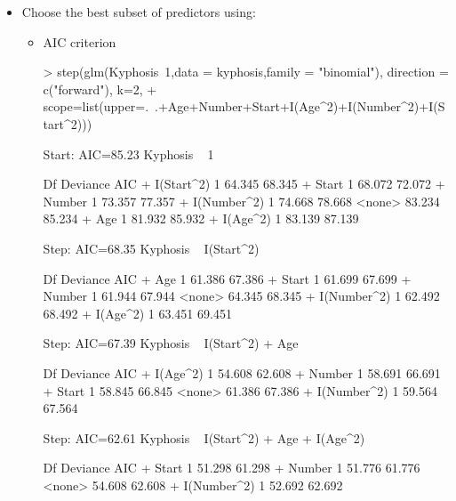 \documentclass[a4paper]{article}
\begin{document}
\begin{itemize}
Comparing AIC values:
\begin{Schunk}
\begin{Sinput}
> kyphosis.lr.model$aic
\end{Sinput}
\begin{Soutput}
[1] 69.37993
\end{Soutput}
\begin{Sinput}
> kyphosis.lr.model.squares$aic
\end{Sinput}
\begin{Soutput}
[1] 61.83235
\end{Soutput}
\end{Schunk}
Akaike Information Criterion is smaller for the bigger model.

All above tests vote in favour of the bigger model.

\item Choose the best subset of predictors using:
\begin{itemize}
\item AIC criterion
\begin{Schunk}
\begin{Sinput}
> step(glm(Kyphosis~1,data = kyphosis,family = "binomial"), direction = c("forward"), k=2, 
+ 		scope=list(upper=.~.+Age+Number+Start+I(Age^2)+I(Number^2)+I(Start^2)))	
\end{Sinput}
\begin{Soutput}
Start:  AIC=85.23
Kyphosis ~ 1

              Df Deviance    AIC
+ I(Start^2)   1   64.345 68.345
+ Start        1   68.072 72.072
+ Number       1   73.357 77.357
+ I(Number^2)  1   74.668 78.668
<none>             83.234 85.234
+ Age          1   81.932 85.932
+ I(Age^2)     1   83.139 87.139

Step:  AIC=68.35
Kyphosis ~ I(Start^2)

              Df Deviance    AIC
+ Age          1   61.386 67.386
+ Start        1   61.699 67.699
+ Number       1   61.944 67.944
<none>             64.345 68.345
+ I(Number^2)  1   62.492 68.492
+ I(Age^2)     1   63.451 69.451

Step:  AIC=67.39
Kyphosis ~ I(Start^2) + Age

              Df Deviance    AIC
+ I(Age^2)     1   54.608 62.608
+ Number       1   58.691 66.691
+ Start        1   58.845 66.845
<none>             61.386 67.386
+ I(Number^2)  1   59.564 67.564

Step:  AIC=62.61
Kyphosis ~ I(Start^2) + Age + I(Age^2)

              Df Deviance    AIC
+ Start        1   51.298 61.298
+ Number       1   51.776 61.776
<none>             54.608 62.608
+ I(Number^2)  1   52.692 62.692


\end{Soutput}
\end{Schunk}
\end{itemize}
\end{itemize}
\end{document}
